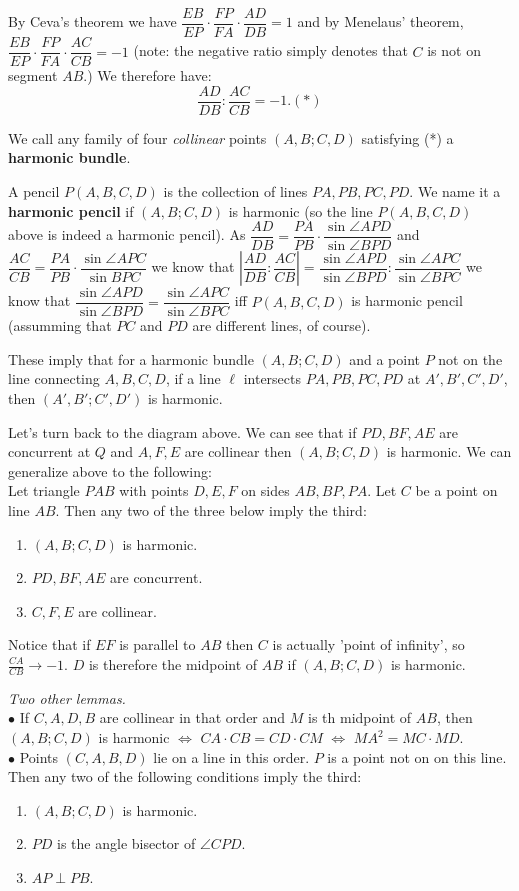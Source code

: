 \documentclass[11pt,a4paper]{article}
\begin{document}
By Ceva's theorem we have $\dfrac{EB}{EP}\cdot\dfrac{FP}{FA}\cdot\dfrac{AD}{DB}=1$ and by Menelaus' theorem, $\dfrac{EB}{EP}\cdot\dfrac{FP}{FA}\cdot\dfrac{AC}{CB}=-1$ (note: the negative ratio simply denotes that $C$ is not on segment $AB$.) We therefore have:
$$\dfrac{AD}{DB}:\dfrac{AC}{CB}=-1. (*)$$

We call any family of four \emph{collinear} points $(A,B;C,D)$ satisfying (*) a \textbf{harmonic bundle}.

A pencil $P(A,B,C,D)$ is the collection of lines $PA, PB, PC, PD$. We name it a \textbf{harmonic pencil} if $(A,B;C,D)$ is harmonic (so the line $P(A,B,C,D)$ above is indeed a harmonic pencil). As $\dfrac{AD}{DB}=\dfrac{PA}{PB}\cdot \dfrac{\sin\angle APD}{\sin\angle BPD}$ and $\dfrac{AC}{CB}=\dfrac{PA}{PB}\cdot \dfrac{\sin\angle APC}{\sin BPC}$ we know that $|\dfrac{AD}{DB}:\dfrac{AC}{CB}|=\dfrac{\sin\angle APD}{\sin\angle BPD}:\dfrac{\sin\angle APC}{\sin\angle BPC}$ we know that $\dfrac{\sin\angle APD}{\sin\angle BPD}=\dfrac{\sin\angle APC}{\sin\angle BPC}$ iff $P(A,B,C,D)$ is harmonic pencil (assumming that $PC$ and $PD$ are different lines, of course).

These imply that for a harmonic bundle $(A,B;C,D)$ and a point $P$ not on the line connecting $A,B,C,D$, if a line $\ell$ intersects $PA, PB, PC, PD$ at $A', B', C', D'$, then $(A',B';C',D')$ is harmonic.

Let's turn back to the diagram above. We can see that if $PD, BF, AE$ are concurrent at $Q$ and $A,F,E$ are collinear then $(A,B;C,D)$ is harmonic. We can generalize above to the following:
\\Let triangle $PAB$ with points $D, E, F$ on sides $AB, BP, PA$. Let $C$ be a point on line $AB$. Then any two of the three below imply the third:
\begin{enumerate}
\item $(A, B; C,D)$ is harmonic.
\item $PD, BF, AE$ are concurrent.
\item $C,F,E$ are collinear.
\end{enumerate}
Notice that if $EF$ is parallel to $AB$ then $C$ is actually 'point of infinity', so $\frac{CA}{CB}\rightarrow -1$. $D$ is therefore the midpoint of $AB$ if $(A,B;C,D)$ is harmonic.

\emph {Two other lemmas.} \\$\bullet$ If $C,A,D,B$ are collinear in that order and $M$ is th midpoint of $AB$, then $(A,B;C,D)$ is harmonic $\Leftrightarrow$ $CA\cdot CB=CD\cdot CM$ $\Leftrightarrow$ $MA^2=MC\cdot MD$.
\\$\bullet$ Points $(C,A,B,D)$ lie on a line in this order. $P$ is a point not on on this line. Then any two of the following conditions imply the third:
\begin{enumerate}
\item $(A,B;C,D)$ is harmonic.
\item $PD$ is the angle bisector of $\angle CPD$.
\item $AP\perp PB.$
\end{enumerate}
\end{document}
